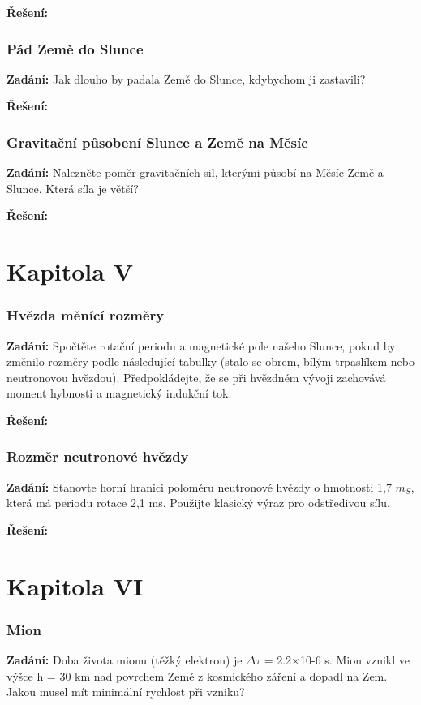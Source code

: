 \documentclass{article}
\begin{document}
\textbf{Řešení:}

\section*{Pád Země do Slunce}
\textbf{Zadání:} Jak dlouho by padala Země do Slunce, kdybychom ji zastavili?

\textbf{Řešení:}

\section*{Gravitační působení Slunce a Země na Měsíc}
\textbf{Zadání:}  Nalezněte poměr gravitačních sil, kterými působí na Měsíc Země a Slunce. Která síla je
větší?

\textbf{Řešení:}

\part*{Kapitola \textrm{V}}

\section*{Hvězda měnící rozměry}
\textbf{Zadání:} Spočtěte rotační periodu a magnetické pole našeho Slunce, pokud by změnilo rozměry
podle následující tabulky (stalo se obrem, bílým trpaslíkem nebo neutronovou hvězdou).
Předpokládejte, že se při hvězdném vývoji zachovává moment hybnosti a magnetický indukční
tok.

\textbf{Řešení:}

\section*{Rozměr neutronové hvězdy}
\textbf{Zadání:}  Stanovte horní hranici poloměru neutronové hvězdy o hmotnosti 1,7 $m_S$, která má
periodu rotace 2,1 ms. Použijte klasický výraz pro odstředivou sílu.

\textbf{Řešení:}

\part*{Kapitola \textrm{V\hspace{-.1em}I}}

\section*{Mion}
\textbf{Zadání:}  Doba života mionu (těžký elektron) je $\Delta \tau$ = 2.2×10-6 s. Mion vznikl ve výšce h = 30 km
nad povrchem Země z kosmického záření a dopadl na Zem. Jakou musel mít minimální rychlost
při vzniku?
\end{document}
